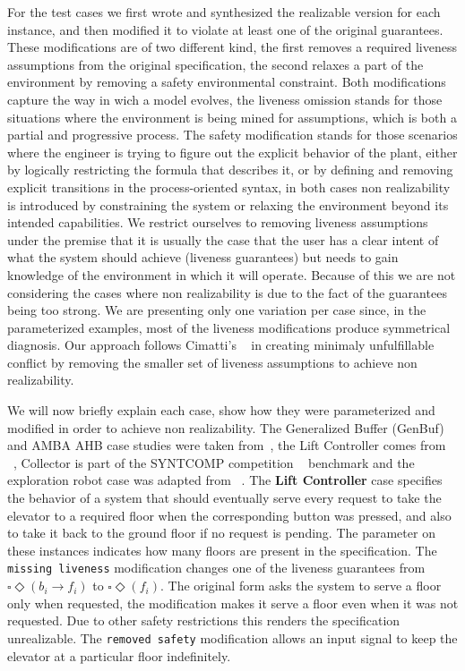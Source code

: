 For the test cases we first wrote and synthesized the realizable version for each instance, and then modified it
to violate at least one of the original guarantees. 
These modifications are of two different kind, the first removes a required liveness assumptions from the original specification, the second relaxes a part of the environment by removing a safety environmental constraint. Both modifications capture the way in wich a model evolves, the liveness omission stands for those situations where the environment is being mined for assumptions, which is both a partial and progressive process. The safety modification stands for those scenarios where the engineer is trying to figure out the explicit behavior of the plant, either by logically restricting the formula that describes it, or by defining and removing explicit transitions in the process-oriented syntax, in both cases non realizability is introduced by constraining the system or relaxing the environment beyond its intended capabilities. We restrict ourselves to removing liveness assumptions under the premise that it is usually the case that the user has a clear intent of what the system should achieve (liveness guarantees) but needs to gain knowledge of the environment in which it will operate.  Because of this we are not considering the cases where non realizability is due to the fact of the guarantees being too strong. We are presenting only one variation per case since, in the parameterized examples, most of the liveness modifications produce symmetrical diagnosis. Our approach follows Cimatti's ~\cite{DBLP:conf/vmcai/CimattiRST08} in creating minimaly unfulfillable conflict by removing the smaller set of liveness assumptions to achieve non realizability.
 
We will now briefly explain each case, show how they were parameterized and modified in order to achieve non realizability. The Generalized Buffer (GenBuf) and AMBA AHB case studies were taken from~\cite{DBLP:conf/hvc/KonighoferHB10}, the Lift Controller comes from ~\cite{DBLP:conf/fmcad/AlurMT13}, Collector is part of the SYNTCOMP competition ~\cite{SYNTCOMP} benchmark and the exploration robot case was adapted from ~\cite{DBLP:journals/corr/abs-2001-07678}. 
The \textbf{Lift Controller} case specifies the behavior of a system that should eventually serve every request to take the elevator to a required floor when the corresponding button was pressed, and also to take it back to the ground floor if no request is pending. The parameter on these instances indicates how many floors are present in the specification. The \texttt{missing liveness} modification changes one of the liveness guarantees from $\square \Diamond (b_i \rightarrow f_i)$ to $\square \Diamond (f_i)$. The original form asks the system to serve a floor only when requested, the modification makes it serve a floor even when it was not requested. Due to other safety restrictions this renders the specification unrealizable. The \texttt{removed safety} modification allows an input signal to keep the elevator at a particular floor indefinitely.

